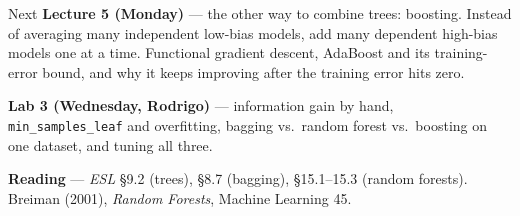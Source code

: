\documentclass[11pt,aspectratio=169]{beamer}
\begin{document}
\begin{frame}{Next}
\textbf{Lecture 5 (Monday)} --- the other way to combine trees: boosting. Instead of averaging many
independent low-bias models, add many dependent high-bias models one at a time. Functional gradient descent,
AdaBoost and its training-error bound, and why it keeps improving after the training error hits zero.
\vspace{8pt}

\textbf{Lab 3 (Wednesday, Rodrigo)} --- information gain by hand, \texttt{min\_samples\_leaf} and overfitting,
bagging vs.\ random forest vs.\ boosting on one dataset, and tuning all three.
\vspace{8pt}

\textbf{Reading} --- \emph{ESL} \S9.2 (trees), \S8.7 (bagging), \S15.1--15.3 (random forests).
Breiman (2001), \emph{Random Forests}, Machine Learning 45.
\end{frame}
\end{document}
